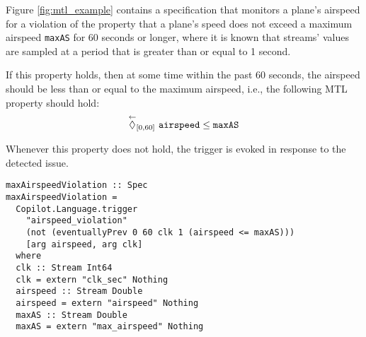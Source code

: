 Figure \ref{fig:mtl_example} contains a specification that monitors a plane's airspeed for a
violation of the property that a plane's speed does not exceed a maximum
airspeed \verb,maxAS, for 60 seconds or longer, where it is known that streams'
values are sampled at a period that is greater than or equal to 1 second.

If this property holds, then at some time within the past 60 seconds,
the airspeed should be less than or equal to the maximum airspeed, i.e.,
the following MTL property should hold:
$$ \overset{\leftarrow}{\lozenge}_{[0,60]}~\verb,airspeed, \leq \verb,maxAS, $$

Whenever this property does not hold, the trigger is evoked in response to
the detected issue.

\begin{figure*}[!htb]
\begin{lstlisting}[frame=none]
maxAirspeedViolation :: Spec
maxAirspeedViolation =
  Copilot.Language.trigger
    "airspeed_violation"
    (not (eventuallyPrev 0 60 clk 1 (airspeed <= maxAS)))
    [arg airspeed, arg clk]
  where
  clk :: Stream Int64
  clk = extern "clk_sec" Nothing
  airspeed :: Stream Double
  airspeed = extern "airspeed" Nothing
  maxAS :: Stream Double
  maxAS = extern "max_airspeed" Nothing
\end{lstlisting}
\caption{An example use of the MTL library.}
\label{fig:mtl_example}
\end{figure*}
